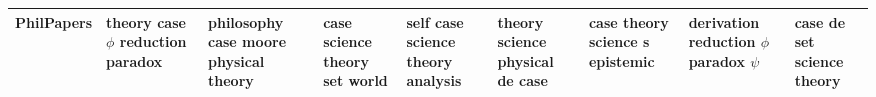 \documentclass[11pt,a4paper]{article}
\begin{document}
\begin{appendices}
\begin{table}[htp]
\begin{tiny}
\begin{tabular}{|p{}|p{}|p{}|p{}|p{}|p{}|p{}|p{}|p{}|}
PhilPapers & theory \newline case \newline $\phi$ \newline reduction \newline paradox & philosophy \newline case \newline moore \newline physical \newline theory & case \newline science \newline theory \newline set \newline world & self \newline case \newline science \newline theory \newline analysis & theory \newline science \newline physical \newline de \newline case & case \newline theory \newline science \newline s \newline epistemic & derivation \newline reduction \newline $\phi$ \newline paradox \newline $\psi$ & case \newline de \newline set \newline science \newline theory\\\hline

\end{tabular}
\end{tiny}
\end{table}
\end{appendices}
\end{document}
